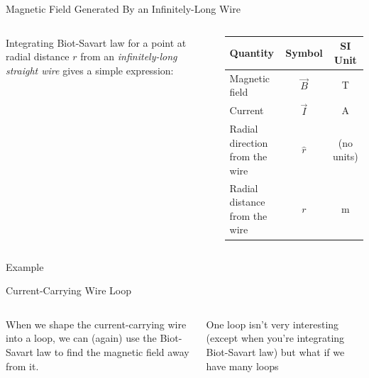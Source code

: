 \documentclass[12pt,aspectratio=169]{beamer}
\begin{document}
\begin{frame}{Magnetic Field Generated By an Infinitely-Long Wire}
  \begin{columns}
    
    Integrating Biot-Savart law for a point at radial distance $r$ from an
    \emph{infinitely-long straight wire} gives a simple expression:


    \begin{tabular}{l|c|c}
      \rowcolor{pink}
      \textbf{Quantity} & \textbf{Symbol} & \textbf{SI Unit} \\ \hline
      Magnetic field      & $\vec B$ & \si\tesla \\
      Current             & $\vec I$ & \si\ampere \\
      Radial direction from the wire & $\hat r$ & (no units)\\
      Radial distance from the wire  & $r$      & \si\metre
    \end{tabular}
  \end{columns}
\end{frame}



\begin{frame}{Example}
\end{frame}



\begin{frame}{Current-Carrying Wire Loop}
  \begin{columns}

    When we shape the current-carrying wire into a loop, we can (again) use
    the Biot-Savart law to find the magnetic field away from it.

    \vspace{.2in}
    One loop isn't very interesting (except when you're integrating Biot-Savart
    law) but what if we have many loops
  \end{columns}
\end{frame}
\end{document}
